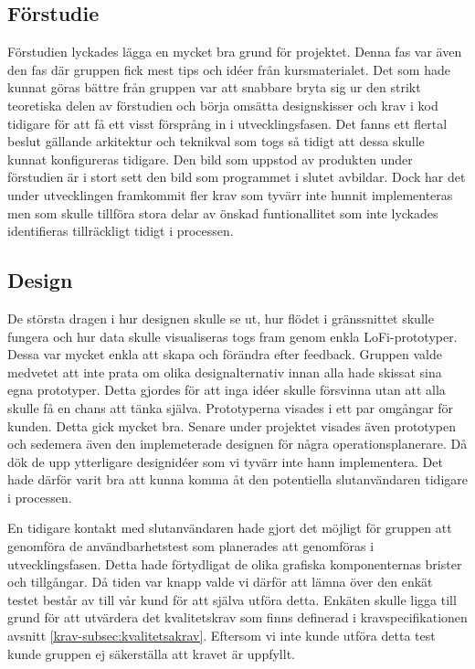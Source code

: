\subsection{Förstudie}
Förstudien lyckades lägga en mycket bra grund för projektet. Denna fas var även den fas där gruppen fick mest tips och idéer från kursmaterialet. Det som hade kunnat göras bättre från gruppen var att snabbare bryta sig ur den strikt teoretiska delen av förstudien och börja omsätta designskisser och krav i kod tidigare för att få ett visst försprång in i utvecklingsfasen. Det fanns ett flertal beslut gällande arkitektur och teknikval som togs så tidigt att dessa skulle kunnat konfigureras tidigare. Den bild som uppstod av produkten under förstudien är i stort sett den bild som programmet i slutet avbildar. Dock har det under utvecklingen framkommit fler krav som tyvärr inte hunnit implementeras men som skulle tillföra stora delar av önskad funtionallitet som inte lyckades identifieras tillräckligt tidigt i processen.

\subsection{Design}
De största dragen i hur designen skulle se ut, hur flödet i gränssnittet skulle fungera och hur data skulle visualiseras togs fram genom enkla LoFi-prototyper. Dessa var mycket enkla att skapa och förändra efter feedback. Gruppen valde medvetet att inte prata om olika designalternativ innan alla hade skissat sina egna prototyper. Detta gjordes för att inga idéer skulle försvinna utan att alla skulle få en chans att tänka själva. Prototyperna visades i ett par omgångar för kunden. Detta gick mycket bra. Senare under projektet visades även prototypen och sedemera även den implemeterade designen för några operationsplanerare. Då dök de upp ytterligare designidéer som vi tyvärr inte hann implementera. Det hade därför varit bra att kunna komma åt den potentiella slutanvändaren tidigare i processen.

En tidigare kontakt med slutanvändaren hade gjort det möjligt för gruppen att genomföra de användbarhetstest som planerades att genomföras i utvecklingsfasen. Detta hade förtydligat de olika grafiska komponenternas brister och tillgångar. Då tiden var knapp valde vi därför att lämna över den enkät testet består av till vår kund för att själva utföra detta. Enkäten skulle ligga till grund för att utvärdera det kvalitetskrav som finns definerad i kravspecifikationen avsnitt \ref{krav-subsec:kvalitetsakrav}. Eftersom vi inte kunde utföra detta test kunde gruppen ej säkerställa att kravet är uppfyllt.

